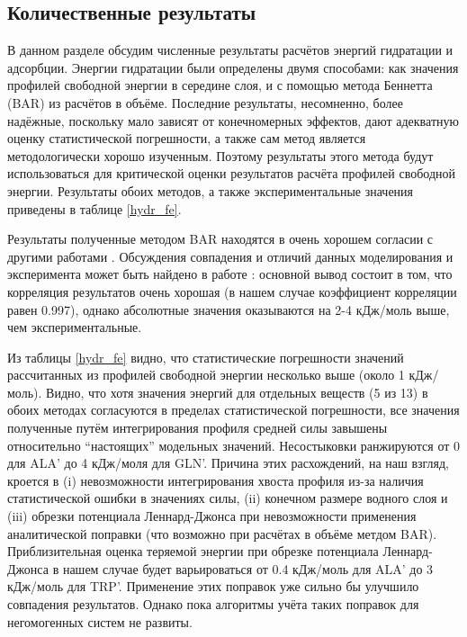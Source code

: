 \subsection{\label{sec:comp_exp}Количественные результаты}
В данном разделе обсудим численные результаты расчётов энергий гидратации и адсорбции. Энергии гидратации были определены двумя способами: как значения профилей свободной энергии в середине слоя, и с помощью метода Беннетта (BAR) из расчётов в объёме. Последние результаты, несомненно, более надёжные, поскольку мало зависят от конечномерных эффектов, дают адекватную оценку статистической погрешности, а также сам метод является методологически хорошо изученным. Поэтому результаты этого метода будут использоваться для критической оценки результатов расчёта профилей свободной энергии.
Результаты обоих методов, а также экспериментальные значения приведены в таблице \ref{hydr_fe}.


Результаты полученные методом BAR находятся в очень хорошем согласии с другими работами \cite{shirts_waterff}. Обсуждения совпадения и отличий данных моделирования и эксперимента может быть найдено в работе \cite{shirts_waterff}: основной вывод состоит в том, что корреляция результатов очень хорошая (в нашем случае коэффициент корреляции равен 0.997), однако абсолютные значения оказываются на 2-4 кДж/моль выше, чем экспериментальные.


Из таблицы \ref{hydr_fe} видно, что статистические погрешности значений рассчитанных из профилей свободной энергии несколько выше (около 1 кДж/моль). Видно, что хотя значения энергий для отдельных веществ (5 из 13) в обоих методах согласуются в пределах статистической погрешности, все значения полученные путём интегрирования профиля средней силы завышены относительно ``настоящих'' модельных значений. Несостыковки ранжируются от 0 для ALA' до 4 кДж/моля для GLN'. Причина этих расхождений, на наш взгляд, кроется в (i) невозможности интегрирования хвоста профиля из-за наличия статистической ошибки в значениях силы, (ii) конечном размере водного слоя и (iii) обрезки потенциала Леннард-Джонса при невозможности применения аналитической поправки (что возможно при расчётах в объёме метдом BAR). Приблизительная оценка теряемой энергии при обрезке потенциала Леннард-Джонса в нашем случае будет варьироваться от 0.4 кДж/моль для ALA' до 3 кДж/моль для TRP'. Применение этих поправок уже сильно бы улучшило совпадения результатов. Однако пока алгоритмы учёта таких поправок для негомогенных систем не развиты.


